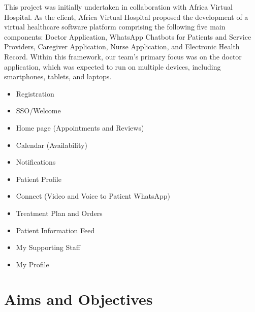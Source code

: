 This project was initially undertaken in collaboration with Africa Virtual Hospital. As the client, Africa Virtual Hospital proposed the development of a virtual healthcare software platform comprising the following five main components: Doctor Application, WhatsApp Chatbots for Patients and Service Providers, Caregiver Application, Nurse Application, and Electronic Health Record. Within this framework, our team's primary focus was on the doctor application, which was expected to run on multiple devices, including smartphones, tablets, and laptops.


\begin {itemize}
    \item Registration
    \item SSO/Welcome
    \item Home page (Appointments and Reviews)
    \item Calendar (Availability)
    \item Notifications
    \item Patient Profile
    \item Connect (Video and Voice to Patient WhatsApp)
    \item Treatment Plan and Orders
    \item Patient Information Feed
    \item My Supporting Staff
    \item My Profile
\end {itemize}


\section{Aims and Objectives}
\label{sec:sec03}

